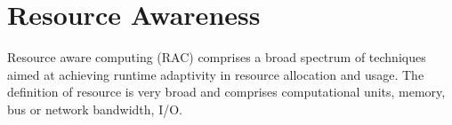 
\section{Resource Awareness}

Resource aware computing (RAC) comprises a broad spectrum of techniques aimed at achieving runtime adaptivity in resource allocation and usage. The definition of resource is very broad and comprises computational units, memory, bus or network bandwidth, I/O.


